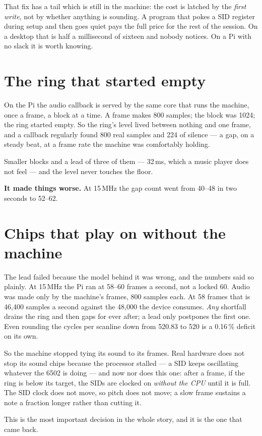 That fix has a tail which is still in the machine: the cost is latched
by the \emph{first write}, not by whether anything is sounding. A
program that pokes a SID register during setup and then goes quiet pays
the full price for the rest of the session. On a desktop that is half a
millisecond of sixteen and nobody notices. On a Pi with no slack it is
worth knowing.

\section{The ring that started empty}
On the Pi the audio callback is served by the same core that runs the
machine, once a frame, a block at a time. A frame makes 800 samples; the
block was 1024; the ring started empty. So the ring's level lived
between nothing and one frame, and a callback regularly found 800 real
samples and 224 of silence --- a gap, on a steady beat, at a frame rate
the machine was comfortably holding.

Smaller blocks and a lead of three of them --- 32\,ms, which a music
player does not feel --- and the level never touches the floor.

\textbf{It made things worse.} At 15\,MHz the gap count went from 40--48
in two seconds to 52--62.

\section{Chips that play on without the machine}
The lead failed because the model behind it was wrong, and the numbers
said so plainly. At 15\,MHz the Pi ran at 58--60 frames a second, not a
locked 60. Audio was made only by the machine's frames, 800 samples
each. At 58 frames that is 46,400 samples a second against the 48,000
the device consumes. \emph{Any} shortfall drains the ring and then gaps
for ever after; a lead only postpones the first one. Even rounding the
cycles per scanline down from 520.83 to 520 is a 0.16\,\% deficit on its
own.

So the machine stopped tying its sound to its frames. Real hardware does
not stop its sound chips because the processor stalled --- a SID keeps
oscillating whatever the 6502 is doing --- and now nor does this one:
after a frame, if the ring is below its target, the SIDs are clocked on
\emph{without the CPU} until it is full. The SID clock does not move, so
pitch does not move; a slow frame sustains a note a fraction longer
rather than cutting it.

This is the most important decision in the whole story, and it is the
one that came back.

